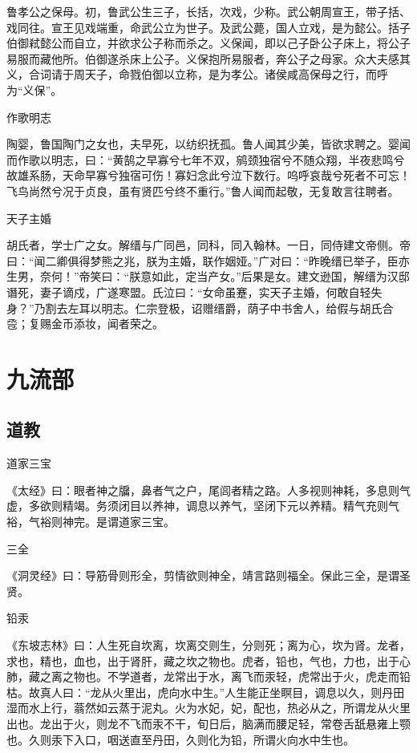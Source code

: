 \documentclass[a4paper,12pt,UTF8,twoside]{ctexbook}
\begin{document}
    鲁孝公之保母。初，鲁武公生三子，长括，次戏，少称。武公朝周宣王，带子括、戏同往。宣王见戏端重，命武公立为世子。及武公薨，国人立戏，是为懿公。括子伯御弒懿公而自立，并欲求公子称而杀之。义保闻，即以己子卧公子床上，将公子易服而藏他所。伯御遂杀床上公子。义保抱所易服者，奔公子之母家。众大夫感其义，合词请于周天子，命戮伯御以立称，是为孝公。诸侯咸高保母之行，而呼为“义保”。
    
    作歌明志
    
    陶婴，鲁国陶门之女也，夫早死，以纺织抚孤。鲁人闻其少美，皆欲求聘之。婴闻而作歌以明志，曰：“黄鹄之早寡兮七年不双，鹓颈独宿兮不随众翔，半夜悲鸣兮故雄系肠，天命早寡兮独宿可伤！寡妇念此兮泣下数行。呜呼哀哉兮死者不可忘！飞鸟尚然兮况于贞良，虽有贤匹兮终不重行。”鲁人闻而起敬，无复敢言往聘者。
    
    天子主婚
    
    胡氏者，学士广之女。解缙与广同邑，同科，同入翰林。一日，同侍建文帝侧。帝曰：“闻二卿俱得梦熊之兆，朕为主婚，联作姻娅。”广对曰：“昨晚缙已举子，臣亦生男，奈何！”帝笑曰：“朕意如此，定当产女。”后果是女。建文逊国，解缙为汉邸谮死，妻子谪戍，广遂寒盟。氏泣曰：“女命虽蹇，实天子主婚，何敢自轻失身？”乃割去左耳以明志。仁宗登极，诏赠缙爵，荫子中书舍人，给假与胡氏合卺；复赐金币添妆，闻者荣之。
    
    \part{九流部}
    
    \chapter{道教}
    
    道家三宝
    
    《太经》曰：眼者神之牖，鼻者气之户，尾闾者精之路。人多视则神耗，多息则气虚，多欲则精竭。务须闭目以养神，调息以养气，坚闭下元以养精。精气充则气裕，气裕则神完。是谓道家三宝。
    
    三全
    
    《洞灵经》曰：导筋骨则形全，剪情欲则神全，靖言路则福全。保此三全，是谓圣贤。
    
    铅汞
    
    《东坡志林》曰：人生死自坎离，坎离交则生，分则死；离为心，坎为肾。龙者，求也，精也，血也，出于肾肝，藏之坎之物也。虎者，铅也，气也，力也，出于心肺，藏之离之物也。不学道者，龙常出于水，离飞而汞轻，虎常出于火，虎走而铅枯。故真人曰：“龙从火里出，虎向水中生。”人生能正坐瞑目，调息以久，则丹田湿而水上行，蓊然如云蒸于泥丸。火为水妃，妃，配也，热必从之，所谓龙从火里出也。龙出于火，则龙不飞而汞不干，旬日后，脑满而腰足轻，常卷舌舐悬雍上颚也。久则汞下入口，咽送直至丹田，久则化为铅，所谓火向水中生也。
    
\end{document}
